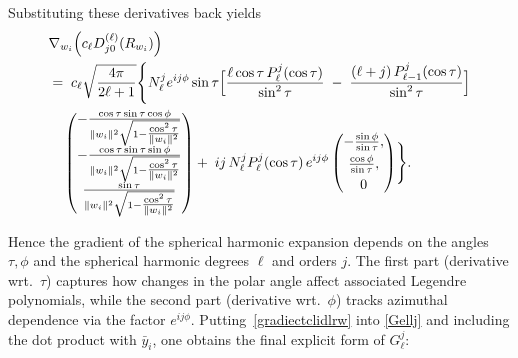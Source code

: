 \documentclass[review,onefignum,onetabnum,onealgnum]{siamart250106}
\numberwithin{theorem}{section}
\begin{document}
Substituting these derivatives back yields
\begin{equation}\label{gradiectclidlrw}
    \begin{aligned}
& \nabla_{w_i}\Bigl(c_{\ell} D_{j0}^{(\ell)}(R_{w_i})\Bigr) \\
&=\; c_{\ell}\sqrt{\frac{4\pi}{2\ell+1}}
\Biggl\{
  N_{\ell}^j e^{ij\phi}\sin\tau
  \Bigl[
    \frac{\ell\cos\tau\,P_{\ell}^j(\cos\tau)}{\sin^2\tau}
    \;-\;
    \frac{(\ell+j)\,P_{\ell-1}^j(\cos\tau)}{\sin^2\tau}
  \Bigr]\\
&\quad \begin{pmatrix}
-\frac{\cos\tau\sin\tau\cos\phi}{\|w_i\|^2\sqrt{1-\tfrac{\cos^2\tau}{\|w_i\|^2}}}\\[4pt]
-\frac{\cos\tau\sin\tau\sin\phi}{\|w_i\|^2\sqrt{1-\tfrac{\cos^2\tau}{\|w_i\|^2}}}\\[4pt]
\frac{\sin\tau}{\|w_i\|^2\sqrt{1-\tfrac{\cos^2\tau}{\|w_i\|^2}}}
\end{pmatrix}
+\;ij\,N_{\ell}^j P_{\ell}^j(\cos\tau)\,e^{ij\phi}
\begin{pmatrix}
-\frac{\sin\phi}{\sin\tau},\\[3pt]
\frac{\cos\phi}{\sin\tau},\\[3pt]
0
\end{pmatrix}
\Biggr\}.
\end{aligned}
\end{equation}


Hence the gradient of the spherical harmonic expansion depends on the angles \(\tau,\phi\) and the spherical harmonic degrees \(\ell\) and orders \(j\).  The first part (derivative wrt.\ \(\tau\)) captures how changes in the polar angle affect associated Legendre polynomials, while the second part (derivative wrt.\ \(\phi\)) tracks azimuthal dependence via the factor \(e^{ij\phi}\). Putting~\eqref{gradiectclidlrw} into \eqref{Gellj} and including the dot product with \(\bar{y}_i\), one obtains the final explicit form of \(G_{\ell}^j\):
\end{document}
